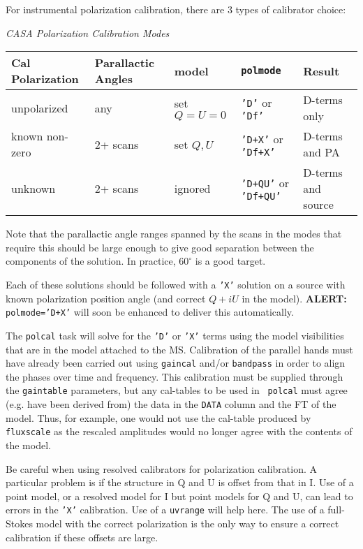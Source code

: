For instrumental polarization calibration, there are 3 types of
calibrator choice:
\begin{center}
{\it CASA Polarization Calibration Modes}\\[5mm]
\begin{tabular}{|l|l|l|l|l|}
\hline
Cal Polarization & Parallactic Angles & model & 
    {\tt polmode} & Result \\
\hline
unpolarized & any & set $Q=U=0$ & {\tt 'D'} or {\tt 'Df'} & D-terms
  only \\
known non-zero & 2+ scans & set $Q,U$ & {\tt 'D+X'} or 
  {\tt 'Df+X'} & D-terms and PA \\
unknown & 2+ scans & ignored & {\tt 'D+QU'} or {\tt 'Df+QU'} &
  D-terms and source \\
\hline
\end{tabular}
\end{center}
Note that the parallactic angle ranges spanned by the scans in the
modes that require this should be large enough to give good separation
between the components of the solution.  In practice, $60^\circ$ is 
a good target.

Each of these solutions should be followed with a {\tt 'X'} solution
on a source with known polarization position angle (and correct $Q+iU$
in the model).  
{\bf ALERT:} {\tt polmode='D+X'} will soon be enhanced to 
deliver this automatically.
           
The {\tt polcal} task will solve for the {\tt 'D'} or {\tt 'X'} terms
using the model visibilities that are in the model attached to the MS.
Calibration of the parallel hands must have already been carried out
using {\tt gaincal} and/or {\tt bandpass} in order to align the phases
over time and frequency.  This calibration must be supplied through
the {\tt gaintable} parameters, but any cal-tables to be used in {\tt
  polcal} must agree (e.g. have been derived from) the data in the
{\tt DATA} column and the FT of the model.  Thus, for example, one
would not use the cal-table produced by {\tt fluxscale} as the
rescaled amplitudes would no longer agree with the contents of the model.

Be careful when using resolved calibrators for polarization
calibration.  A particular problem is if the structure in Q and U is
offset from that in I.  Use of a point model, or a resolved model for
I but point models for Q and U, can lead to errors in the {\tt 'X'} 
calibration.  Use of a {\tt uvrange} will help here.  The use of a
full-Stokes model with the correct polarization is the only way to 
ensure a correct calibration if these offsets are large.

